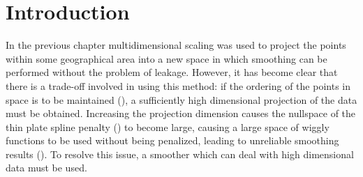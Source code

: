 \label{chap-gds}

\section{Introduction}
\label{gds-intro}

In the previous chapter multidimensional scaling was used to project the points within some geographical area into a new space in which smoothing can be performed without the problem of leakage. However, it has become clear that there is a trade-off involved in using this method: if the ordering of the points in space is to be maintained (), a sufficiently high dimensional projection of the data must be obtained. Increasing the projection dimension causes the nullspace of the thin plate spline penalty () to become large, causing a large space of wiggly functions to be used without being penalized, leading to unreliable smoothing results (). To resolve this issue, a smoother which can deal with high dimensional data must be used. 

